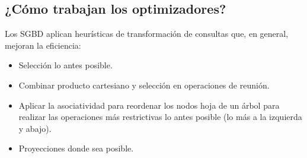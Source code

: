 \subsection{¿Cómo trabajan los optimizadores?}
Los SGBD aplican heurísticas de transformación de consultas que, en general, mejoran la eficiencia:
\begin{itemize}
\item Selección lo antes posible.
\item Combinar producto cartesiano y selección en operaciones de reunión.
\item Aplicar la asociatividad para reordenar los nodos hoja de un árbol para realizar las operaciones más restrictivas lo antes posible (lo más a la izquierda y abajo).
\item Proyecciones donde sea posible.
\end{itemize}

